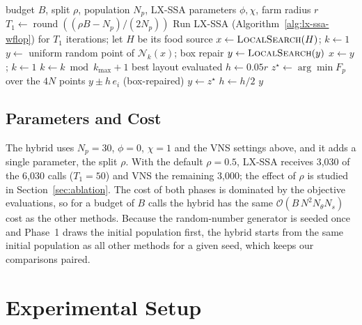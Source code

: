\documentclass[journal,twoside]{IEEEtran}
\begin{document}
\begin{algorithm}
\caption{Hybrid LX-SSA-VNS for a prescribed turbine count $N$}
\label{alg:hybrid}
\begin{algorithmic}[1]
\Require budget $B$, split $\rho$, population $N_p$, LX-SSA parameters $\phi,\chi$, farm radius $r$
\State $T_1\gets\operatorname{round}((\rho B-N_p)/(2N_p))$
\State Run LX-SSA (Algorithm~\ref{alg:lx-ssa-wflop}) for $T_1$ iterations; let $H$ be its food source
\State $x\gets\textsc{LocalSearch}(H)$; $k\gets1$
    \State $y\gets$ uniform random point of $\mathcal N_k(x)$; box repair
    \State $y\gets\textsc{LocalSearch}(y)$
        \State $x\gets y$; $k\gets1$
    \Else
        \State $k\gets k\bmod k_{\max}+1$
    \EndIf
\EndWhile
\State \Return best layout evaluated
\Statex
{} 
    \State $h\gets0.05r$
        \State $z^\star\gets\arg\min F_p$ over the $4N$ points $y\pm h\,e_i$ (box-repaired)
         \State $y\gets z^\star$ \Else \State $h\gets h/2$ \EndIf
    \EndWhile
    \State \Return $y$
\EndFunction
\end{algorithmic}
\end{algorithm}

\subsection{Parameters and Cost}
The hybrid uses $N_p=30$, $\phi=0$, $\chi=1$ and the VNS settings above, and it adds a single parameter, the split $\rho$. With the default $\rho=0.5$, LX-SSA receives 3,030 of the 6,030 calls ($T_1=50$) and VNS the remaining 3,000; the effect of $\rho$ is studied in Section~\ref{sec:ablation}. The cost of both phases is dominated by the objective evaluations, so for a budget of $B$ calls the hybrid has the same $\mathcal O(B\,N^2N_\theta N_s)$ cost as the other methods. Because the random-number generator is seeded once and Phase~1 draws the initial population first, the hybrid starts from the same initial population as all other methods for a given seed, which keeps our comparisons paired.

\section{Experimental Setup}
\label{sec:setup}
\end{document}
